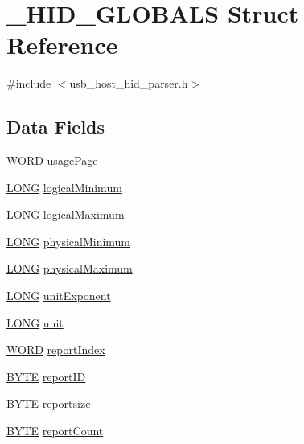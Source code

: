 \hypertarget{struct___h_i_d___g_l_o_b_a_l_s}{}\section{\+\_\+\+H\+I\+D\+\_\+\+G\+L\+O\+B\+A\+L\+S Struct Reference}
\label{struct___h_i_d___g_l_o_b_a_l_s}


{\ttfamily \#include $<$usb\+\_\+host\+\_\+hid\+\_\+parser.\+h$>$}

\subsection*{Data Fields}
\begin{DoxyCompactItemize}
\item 
\hyperlink{_generic_type_defs_8h_a2b0e863dadf920709ec53d9088ee7c91}{W\+O\+R\+D} \hyperlink{struct___h_i_d___g_l_o_b_a_l_s_aa44ef18c8cbb507831398f1e85c62d0b}{usage\+Page}
\item 
\hyperlink{_generic_type_defs_8h_a73a5fec9b19159a6647fbf000017b221}{L\+O\+N\+G} \hyperlink{struct___h_i_d___g_l_o_b_a_l_s_aa690c5d7acbafef6b94bb7dd2e322575}{logical\+Minimum}
\item 
\hyperlink{_generic_type_defs_8h_a73a5fec9b19159a6647fbf000017b221}{L\+O\+N\+G} \hyperlink{struct___h_i_d___g_l_o_b_a_l_s_a0d21eae64550791063f8fc53c7720c78}{logical\+Maximum}
\item 
\hyperlink{_generic_type_defs_8h_a73a5fec9b19159a6647fbf000017b221}{L\+O\+N\+G} \hyperlink{struct___h_i_d___g_l_o_b_a_l_s_a699961d0956e0505697a0fd456d2c5ff}{physical\+Minimum}
\item 
\hyperlink{_generic_type_defs_8h_a73a5fec9b19159a6647fbf000017b221}{L\+O\+N\+G} \hyperlink{struct___h_i_d___g_l_o_b_a_l_s_a9900a11df4d44927b37e192974af3dae}{physical\+Maximum}
\item 
\hyperlink{_generic_type_defs_8h_a73a5fec9b19159a6647fbf000017b221}{L\+O\+N\+G} \hyperlink{struct___h_i_d___g_l_o_b_a_l_s_a48cc4979b42ac62d7635e93bbc5dda4f}{unit\+Exponent}
\item 
\hyperlink{_generic_type_defs_8h_a73a5fec9b19159a6647fbf000017b221}{L\+O\+N\+G} \hyperlink{struct___h_i_d___g_l_o_b_a_l_s_a81f5ec57d09635b0d04108d12546d7b4}{unit}
\item 
\hyperlink{_generic_type_defs_8h_a2b0e863dadf920709ec53d9088ee7c91}{W\+O\+R\+D} \hyperlink{struct___h_i_d___g_l_o_b_a_l_s_a2136285729938850bb7dc9c0ffa362aa}{report\+Index}
\item 
\hyperlink{_generic_type_defs_8h_a4ae1dab0fb4b072a66584546209e7d58}{B\+Y\+T\+E} \hyperlink{struct___h_i_d___g_l_o_b_a_l_s_a22c28a72fd9262be3873e68ec1504ac8}{report\+I\+D}
\item 
\hyperlink{_generic_type_defs_8h_a4ae1dab0fb4b072a66584546209e7d58}{B\+Y\+T\+E} \hyperlink{struct___h_i_d___g_l_o_b_a_l_s_a7acc4432a69ea6facee3bfb182caa25c}{reportsize}
\item 
\hyperlink{_generic_type_defs_8h_a4ae1dab0fb4b072a66584546209e7d58}{B\+Y\+T\+E} \hyperlink{struct___h_i_d___g_l_o_b_a_l_s_a48899e70da0d5fe2099bd6dfd8e1e42b}{report\+Count}
\end{DoxyCompactItemize}


